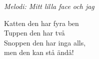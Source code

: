 {\footnotesize\textit{Melodi: Mitt lilla face och jag}}\par
\vspace{10pt}
Katten den har fyra ben\\
Tuppen den har två\\
Snoppen den har inga alls,\\
men den kan stå ändå!
